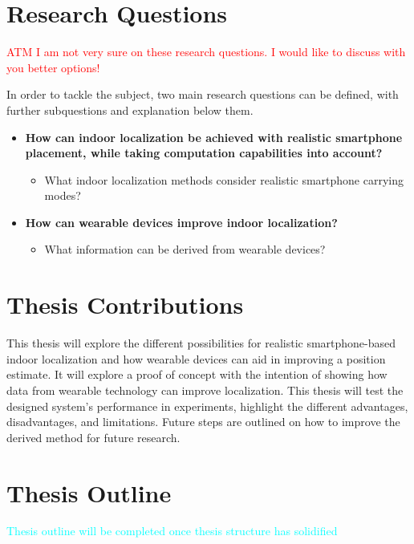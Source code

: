 \section{Research Questions}
\textcolor{red}{ATM I am not very sure on these research questions. I would like to discuss with you better options!}

In order to tackle the subject, two main research questions can be defined, with further subquestions and explanation below them.

\begin{itemize}
	\item \textbf{How can indoor localization be achieved with realistic smartphone placement, while taking computation capabilities into account?}
	\begin{itemize}
		\item What indoor localization methods consider realistic smartphone carrying modes? 
	\end{itemize}
	\item\textbf{How can wearable devices improve indoor localization?}
	\begin{itemize}
		\item What information can be derived from wearable devices?
	\end{itemize}
\end{itemize}

\section{Thesis Contributions}
This thesis will explore the different possibilities for realistic smartphone-based indoor localization and how wearable devices can aid in improving a position estimate. It will explore a proof of concept with the intention of showing how data from wearable technology can improve localization. This thesis will test the designed system's performance in experiments, highlight the different advantages, disadvantages, and limitations. Future steps are outlined on how to improve the derived method for future research.

\section{Thesis Outline}
\textcolor{cyan}{Thesis outline will be completed once thesis structure has solidified}